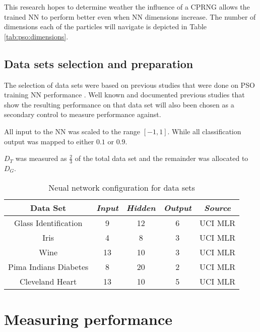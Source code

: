\documentclass[conference]{IEEEtran}
\begin{document}
    This research hopes to determine weather the influence of a \ac{CPRNG} allows the trained \ac{NN} to perform better even when \ac{NN} dimensions increase. The number of dimensions each of the particles will navigate is depicted in Table \ref{tab:pso:dimensions}.

	\subsection{Data sets selection and preparation}
	The selection of data sets were based on previous studies that were done on \ac{PSO} training \ac{NN} performance \cite{anna:saturation-psonn, vanwyk:overfitting-psoffnn}. Well known and documented previous studies that show the resulting performance on that data set will also been chosen as a secondary control to measure performance against.
	
	All input to the \ac{NN} was scaled to the range $ [-1, 1] $. While all classification output was mapped to either $ 0.1 $ or $ 0.9 $.
	
	$ D_T $ was measured as $ \frac{2}{3} $ of the total data set and the remainder was allocated to $ D_G $.
	
	\begin{table}[htbp]
    \caption{Neual network configuration for data sets}
    \begin{center}
    \begin{tabular}{|c|c|c|c|c|}
    \hline
    \textbf{Data Set}& \textbf{\textit{Input}}& \textbf{\textit{Hidden}}& \textbf{\textit{Output}}& \textbf{\textit{Source}}\\
    \hline
    Glass Identification& 9& 12& 6& UCI MLR\cite{uci:mlr}\\
    \hline
    Iris& 4& 8& 3& UCI MLR\cite{uci:mlr}\\
    \hline
    Wine& 13& 10& 3& UCI MLR\cite{uci:mlr}\\
    \hline
    Pima Indians Diabetes& 8& 20& 2& UCI MLR\cite{uci:mlr}\\
    \hline
    Cleveland Heart& 13& 10& 5& UCI MLR\cite{uci:mlr}\\
    \hline
    \end{tabular}
    \label{tab:nn:configuration}
    \end{center}
    \end{table}

\section{Measuring performance}
\end{document}
